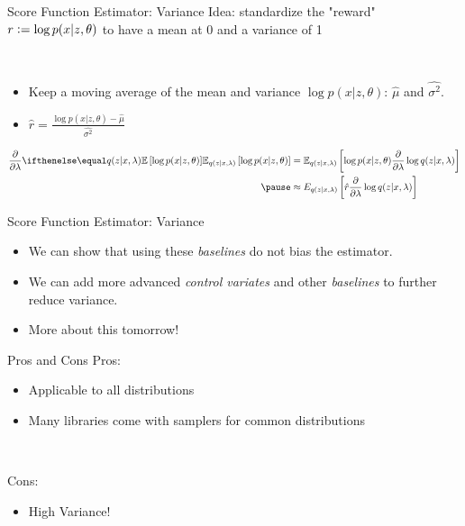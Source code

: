 \begin{frame}{Score Function Estimator: Variance}
Idea: standardize the "reward" $r \vcentcolon= \log p(x|z, \theta)$ to have a mean at 0 and a variance of 1 \pause

~ 

\begin{itemize}
  \setlength\itemsep{0.7em}
    \item Keep a moving average of the mean and variance $\log p(x|z, \theta)$: $\hat{\mu}$ and $\hat{\sigma^2}$. \pause
    \item $\hat{r} = \frac{\log p(x|z, \theta)-\hat{\mu}}{\hat{\sigma^2}}$
\end{itemize}

\pause

\begin{small}
\begin{equation*}
\begin{aligned}
\pdv{\lambda}\E[q(z|x,\lambda)]{\log p(x|z,\theta)}
&= \mathbb E_{q(z|x,\lambda)} \left[  \log p(x|z,\theta)  \pdv{\lambda}\log q(z|x,\lambda)\right]\\ \pause
&\approx E_{q(z|x,\lambda)} \left[  \hat{r} \pdv{\lambda}\log q(z|x,\lambda)\right]
\end{aligned}
\end{equation*}
\end{small}

\end{frame}

\begin{frame}{Score Function Estimator: Variance}

\begin{itemize}
    \item We can show that using these \emph{baselines} do not bias the estimator. \pause
    \item We can add more advanced \emph{control variates} and other \emph{baselines} to further reduce variance. \pause
    \item More about this tomorrow!
\end{itemize}

\end{frame}

\begin{frame}{Pros and Cons}
Pros:
\begin{itemize}
\item Applicable to all distributions
\item Many libraries come with samplers for common distributions
\end{itemize}
\pause

~

Cons:
\begin{itemize}
\item High Variance!
\end{itemize}
\end{frame}



